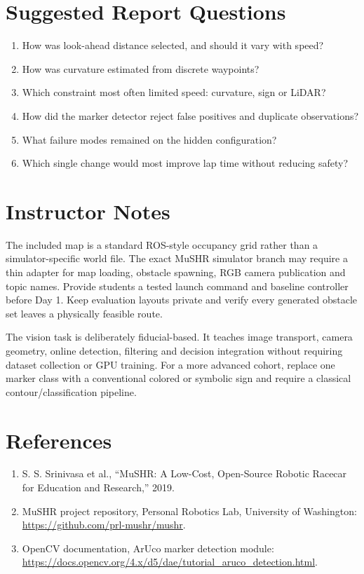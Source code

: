 \documentclass[11pt,a4paper]{article}
\begin{document}
\section{Suggested Report Questions}
\begin{enumerate}
  \item How was look-ahead distance selected, and should it vary with speed?
  \item How was curvature estimated from discrete waypoints?
  \item Which constraint most often limited speed: curvature, sign or LiDAR?
  \item How did the marker detector reject false positives and duplicate observations?
  \item What failure modes remained on the hidden configuration?
  \item Which single change would most improve lap time without reducing safety?
\end{enumerate}

\section{Instructor Notes}
The included map is a standard ROS-style occupancy grid rather than a simulator-specific world file. The exact MuSHR simulator branch may require a thin adapter for map loading, obstacle spawning, RGB camera publication and topic names. Provide students a tested launch command and baseline controller before Day 1. Keep evaluation layouts private and verify every generated obstacle set leaves a physically feasible route.

The vision task is deliberately fiducial-based. It teaches image transport, camera geometry, online detection, filtering and decision integration without requiring dataset collection or GPU training. For a more advanced cohort, replace one marker class with a conventional colored or symbolic sign and require a classical contour/classification pipeline.

\section{References}
\begin{enumerate}
  \item S. S. Srinivasa et al., ``MuSHR: A Low-Cost, Open-Source Robotic Racecar for Education and Research,'' 2019.
  \item MuSHR project repository, Personal Robotics Lab, University of Washington: \url{https://github.com/prl-mushr/mushr}.
  \item OpenCV documentation, ArUco marker detection module: \url{https://docs.opencv.org/4.x/d5/dae/tutorial_aruco_detection.html}.
\end{enumerate}
\end{document}
